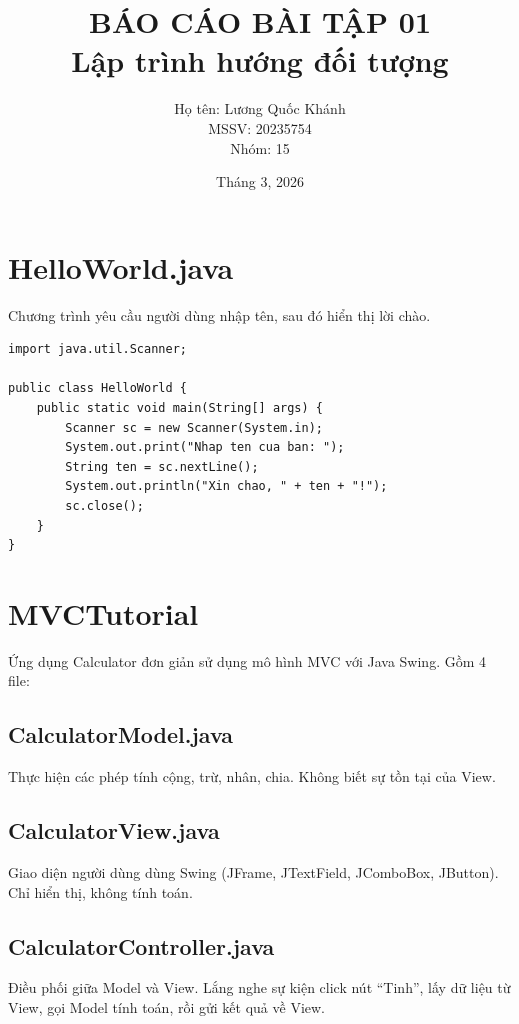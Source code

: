 \documentclass[12pt,a4paper]{article}
\title{\textbf{BÁO CÁO BÀI TẬP 01} \\ Lập trình hướng đối tượng}
\author{
    Họ tên: Lương Quốc Khánh \\
    MSSV: 20235754 \\
    Nhóm: 15
}
\date{Tháng 3, 2026}
\begin{document}
\maketitle
\tableofcontents
\newpage

\section{HelloWorld.java}

Chương trình yêu cầu người dùng nhập tên, sau đó hiển thị lời chào.

\begin{lstlisting}
import java.util.Scanner;

public class HelloWorld {
    public static void main(String[] args) {
        Scanner sc = new Scanner(System.in);
        System.out.print("Nhap ten cua ban: ");
        String ten = sc.nextLine();
        System.out.println("Xin chao, " + ten + "!");
        sc.close();
    }
}
\end{lstlisting}

\section{MVCTutorial}

Ứng dụng Calculator đơn giản sử dụng mô hình MVC với Java Swing. Gồm 4 file:

\subsection{CalculatorModel.java}
Thực hiện các phép tính cộng, trừ, nhân, chia. Không biết sự tồn tại của View.

\subsection{CalculatorView.java}
Giao diện người dùng dùng Swing (JFrame, JTextField, JComboBox, JButton). Chỉ hiển thị, không tính toán.

\subsection{CalculatorController.java}
Điều phối giữa Model và View. Lắng nghe sự kiện click nút ``Tinh'', lấy dữ liệu từ View, gọi Model tính toán, rồi gửi kết quả về View.
\end{document}
